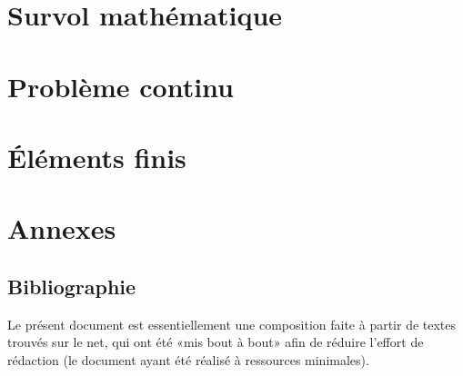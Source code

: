 \documentclass[11pt,pdflatex]{book}
\begin{document}
\cleardoublepage
\tableofcontents


 \part{Survol mathématique}
 
 
 
 
 
 

 \part{Problème continu}
 
 

 \part{Éléments finis}
 
 
 
 
 
% 
 
 
 
 
 

 \appendix
 \part{Annexes}
 
 
 
 
 


\ifVersionDuDocEstVincent
   \chapter*{Bibliographie}

 Le présent document est essentiellement une composition faite à partir de textes trouvés sur le net, qui ont été «mis bout à bout» afin de réduire l'effort  de rédaction (le document ayant été réalisé à ressources minimales).
\end{document}

